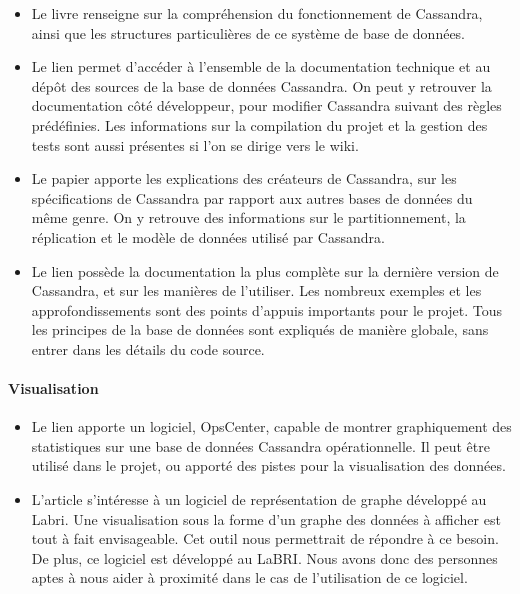 \documentclass[12pt]{article}
\begin{document}
\begin{itemize}
\item Le livre \cite{Hewitt2010} renseigne sur la compréhension du fonctionnement de Cassandra, ainsi que les structures particulières de ce système de base de données.

\item Le lien \cite{ApacheCassandra09} permet d'accéder à l'ensemble de la documentation technique et au dépôt des sources de la base de données Cassandra. On peut y retrouver la documentation côté développeur, pour modifier Cassandra suivant des règles prédéfinies. Les informations sur la compilation du projet et la gestion des tests sont aussi présentes si l'on se dirige vers le wiki.

\item Le papier \cite{FacebookCassandra09} apporte les explications des créateurs de Cassandra, sur les spécifications de Cassandra par rapport aux autres bases de données du même genre. On y retrouve des informations sur le partitionnement, la réplication et le modèle de données utilisé par Cassandra.

\item Le lien \cite{DSDocCassandra15} possède la documentation la plus complète sur la dernière version de Cassandra, et sur les manières de l'utiliser.
Les nombreux exemples et les approfondissements sont des points d'appuis importants pour le projet. Tous les principes de la base de données sont expliqués de manière globale, sans entrer dans les détails du code source.

\end{itemize}

\paragraph{Visualisation}

\begin{itemize}
\item Le lien \cite{DSOpsCenter14} apporte un logiciel, OpsCenter, capable de montrer graphiquement des statistiques sur une base de données Cassandra opérationnelle. Il peut être utilisé dans le projet, ou apporté des pistes pour la visualisation des données.

\item L'article \cite{Tulip12} s'intéresse à un logiciel de représentation de graphe développé au Labri. Une visualisation sous la forme d'un graphe des données à afficher est tout à fait envisageable. Cet outil nous permettrait de répondre à ce besoin. De plus, ce logiciel est développé au LaBRI. Nous avons donc des personnes aptes à nous aider à proximité dans le cas de l'utilisation de ce logiciel.
\end{itemize} 
\end{document}
